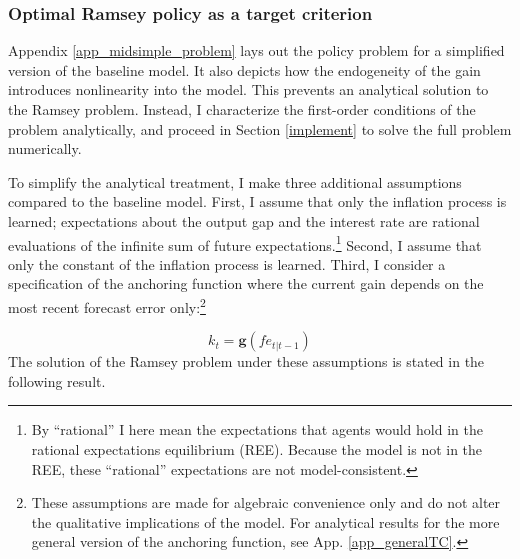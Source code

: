 \documentclass[11pt]{article}
\renewcommand{\[}{\begin{equation}}
\renewcommand{\]}{\end{equation}}
\begin{document}

\subsubsection{Optimal Ramsey policy as a target criterion}

Appendix \ref{app_midsimple_problem} lays out the policy problem for a simplified version of the baseline model. It also depicts how the endogeneity of the gain introduces nonlinearity into the model. This prevents an analytical solution to the Ramsey problem. Instead, I characterize the first-order conditions of the problem analytically, and proceed in Section \ref{implement} to solve the full problem numerically. 

To simplify the analytical treatment, I make three additional assumptions compared to the baseline model. First, I assume that only the  inflation process is learned; expectations about the output gap and the interest rate are rational evaluations of the infinite sum of future expectations.\footnote{By ``rational'' I here mean the expectations that agents would hold in the rational expectations equilibrium (REE). Because the model is not in the REE, these ``rational'' expectations are not model-consistent.} Second, I assume that only the constant of the inflation process is learned. Third, I consider a specification of the anchoring function where the current gain depends on the most recent forecast error only:\footnote{These assumptions are made for algebraic convenience only and do not alter the qualitative implications of the model. For analytical results for the more general version of the anchoring function, see App. \ref{app_generalTC}.}

\begin{equation}
k_t = \mathbf{g}(fe_{t|t-1}) \label{anchoring_simple}
\end{equation}
The solution of the Ramsey problem under these assumptions is stated in the following result.
\end{document}
